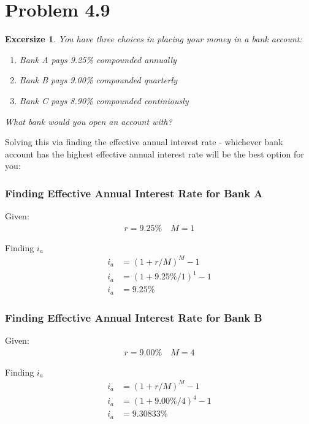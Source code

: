 \documentclass[../INDE250HW.tex]{subfiles}
\newtheorem{exrc}{Excersize}
\begin{document}
\newpage
\section*{Problem 4.9}
\begin{exrc}
    You have three choices in placing your money in a bank account:
    \begin{enumerate}
        \item Bank A pays 9.25\% compounded annually
        \item Bank B pays 9.00\% compounded quarterly
        \item Bank C pays 8.90\% compounded continiously
    \end{enumerate}
    What bank would you open an account with?
\end{exrc}
Solving this via finding the effective annual interest rate - whichever bank account has the highest effective annual interest rate will be the best option for you:
\subsubsection*{Finding Effective Annual Interest Rate for Bank A}
Given:
\begin{equation*}
    \begin{aligned}
        r = 9.25\% \quad M = 1
    \end{aligned}
\end{equation*}

\noindent
Finding $i_a$
\begin{equation*}
    \begin{aligned}
        i_a &= (1 + r/M)^M - 1 \\
        i_a &= (1 + 9.25\%/1)^1 - 1 \\
        i_a &= 9.25\%
    \end{aligned}
\end{equation*}

\subsubsection*{Finding Effective Annual Interest Rate for Bank B}
Given:
\begin{equation*}
    \begin{aligned}
        r = 9.00\% \quad M = 4
    \end{aligned}
\end{equation*}

\noindent
Finding $i_a$
\begin{equation*}
    \begin{aligned}
        i_a &= (1 + r/M)^M - 1 \\
        i_a &= (1 + 9.00\%/4)^4 - 1 \\
        i_a &= 9.30833\%
    \end{aligned}
\end{equation*}
\end{document}
